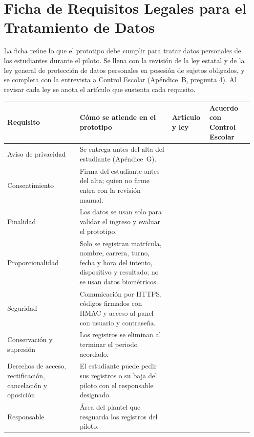 \section{Ficha de Requisitos Legales para el Tratamiento de Datos}
La ficha reúne lo que el prototipo debe cumplir para tratar datos personales
de los estudiantes durante el piloto. Se llena con la revisión de la ley
estatal \parencite{edomex2017datos} y de la ley general
\parencite{lgpdppso2025} de protección de datos personales en posesión de
sujetos obligados, y se completa con la entrevista a Control Escolar
(Apéndice~B, pregunta 4). Al revisar cada ley se anota el artículo que
sustenta cada requisito.

\medskip
\noindent
{\small\linespread{1}\selectfont\renewcommand{\arraystretch}{1.4}
	\begin{tabular}{|p{3cm}|p{5.2cm}|p{2.6cm}|p{3.6cm}|}
		\hline
		\textbf{Requisito} & \textbf{Cómo se atiende en el prototipo} & \textbf{Artículo y ley} & \textbf{Acuerdo con Control Escolar} \\
		\hline
		Aviso de privacidad & Se entrega antes del alta del estudiante (Apéndice~G). & & \\[1.2em] \hline
		Consentimiento & Firma del estudiante antes del alta; quien no firme entra con la revisión manual. & & \\[1.2em] \hline
		Finalidad & Los datos se usan solo para validar el ingreso y evaluar el prototipo. & & \\[1.2em] \hline
		Proporcionalidad & Solo se registran matrícula, nombre, carrera, turno, fecha y hora del intento, dispositivo y resultado; no se usan datos biométricos. & & \\[1.2em] \hline
		Seguridad & Comunicación por HTTPS, códigos firmados con HMAC y acceso al panel con usuario y contraseña. & & \\[1.2em] \hline
		Conservación y supresión & Los registros se eliminan al terminar el periodo acordado. & & \\[1.2em] \hline
		Derechos de acceso, rectificación, cancelación y oposición & El estudiante puede pedir sus registros o su baja del piloto con el responsable designado. & & \\[1.2em] \hline
		Responsable & Área del plantel que resguarda los registros del piloto. & & \\[1.2em] \hline
	\end{tabular}}
